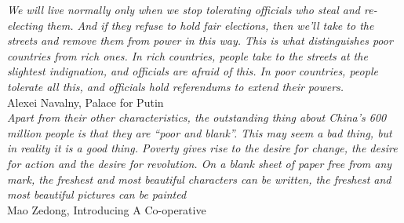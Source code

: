 \documentclass[a4paper, 12pt]{article}
\begin{document}
	
        
        
        
    \tableofcontents
	
    \newpage
    
    \begin{flushright}
        \textit{We will live normally only when we stop tolerating officials who steal and re-electing them. And if they refuse to hold fair elections, then we’ll take to the streets and remove them from power in this way. This is what distinguishes poor countries from rich ones. In rich countries, people take to the streets at the slightest indignation, and officials are afraid of this. In poor countries, people tolerate all this, and officials hold referendums to extend their powers.} 
        \\
        \vspace{1ex}
        Alexei Navalny, Palace for Putin 
        \\
        \vspace{2ex}
        \textit{Apart from their other characteristics, the outstanding thing about China’s 600 million people is that they are “poor and blank”. This may seem a bad thing, but in reality it is a good thing. Poverty gives rise to the desire for change, the desire for action and the desire for revolution. On a blank sheet of paper free from any mark, the freshest and most beautiful characters can be written, the freshest and most beautiful pictures can be painted}
        \\
        \vspace{1ex}
        Mao Zedong, Introducing A Co-operative
    \end{flushright}
	
\end{document}
